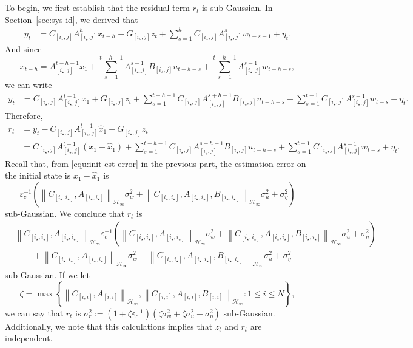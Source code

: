 \documentclass[11pt, twoside]{article}
\theoremstyle{definition}
\newcommand{\norm}[1]{\left\lVert #1 \right\rVert}
\newcommand{\hinfnorm}[1]{\norm{#1}_{\mathcal{H}_\infty}}
\begin{document}
To begin, we first establish that the residual term $r_t$ is sub-Gaussian.
In Section~\ref{sec:sys-id}, we derived that
\begin{align*}
    y_t
    &= C_{[i_\star, j]} A_{[i_\star, j]}^{h} x_{t-h} +  G_{[i_\star, j]} z_t +  \sum_{s=1}^h C_{[i_\star, j]} A_{[i_\star, j]}^{s} w_{t-s-1} +  \eta_t.
\end{align*}
And since
\[x_{t-h} = A_{[i_\star, j]}^{t-h-1} x_{1} + \sum_{s=1}^{t-h-1} A_{[i_\star, j]}^{s-1} B_{[i_\star, j]} u_{t-h-s} + \sum_{s=1}^{t-h-1} A_{[i_\star, j]}^{s-1} w_{t-h-s},\]
we can write
\begin{align*}
    y_t
    &= C_{[i_\star, j]} A_{[i_\star, j]}^{t-1} x_{1} + G_{[i_\star, j]} z_t + \sum_{s=1}^{t-h-1} C_{[i_\star, j]} A_{[i_\star, j]}^{s+h-1} B_{[i_\star, j]} u_{t-h-s} + \sum_{s=1}^{t-1} C_{[i_\star, j]} A_{[i_\star, j]}^{s-1} w_{t-s} + \eta_t.
\end{align*}
Therefore, 
\begin{align*}
    r_t 
    &= y_t - C_{[i_\star,j]}A_{[i_\star,j]}^{t-1} \hat{x}_1 - G_{[i_\star,j]} z_t \\
    &= C_{[i_\star, j]} A_{[i_\star, j]}^{t-1} (x_{1} - \hat{x}_1) + \sum_{s=1}^{t-h-1} C_{[i_\star, j]} A_{[i_\star, j]}^{s+h-1} B_{[i_\star, j]} u_{t-h-s} + \sum_{s=1}^{t-1} C_{[i_\star, j]} A_{[i_\star, j]}^{s-1} w_{t-s} + \eta_t.
\end{align*}
Recall that, from \eqref{equ:init-est-error} in the previous part, the estimation error on the initial state is $x_1 - \hat{x}_1$ is 
\[ \varepsilon_c^{-1}(\hinfnorm{C_{[i_\star, i_\star]}, A_{[i_\star, i_\star]}}\sigma_w^2 + \hinfnorm{C_{[i_\star, i_\star]}, A_{[i_\star, i_\star]}, B_{[i_\star, i_\star]}}\sigma_u^2 + \sigma_\eta^2)\]
sub-Gaussian.
We conclude that $r_t$ is
\begin{align*}
    & \hinfnorm{C_{[i_\star, i_\star]}, A_{[i_\star, i_\star]}} \varepsilon_c^{-1}(\hinfnorm{C_{[i_\star, i_\star]}, A_{[i_\star, i_\star]}}\sigma_w^2 + \hinfnorm{C_{[i_\star, i_\star]}, A_{[i_\star, i_\star]}, B_{[i_\star, i_\star]}}\sigma_u^2 + \sigma_\eta^2) \\
    &\quad\quad+ \hinfnorm{C_{[i_\star, i_\star]}, A_{[i_\star, i_\star]}} \sigma_w^2 + \hinfnorm{C_{[i_\star, i_\star]}, A_{[i_\star, i_\star]}, B_{[i_\star, i_\star]}} \sigma_u^2 + \sigma_\eta^2
\end{align*}
sub-Gaussian.
If we let 
\[\zeta = \max \left\{\hinfnorm{C_{[i, i]}, A_{[i, i]}}, \hinfnorm{C_{[i, i]}, A_{[i, i]}, B_{[i, i]}} : 1 \le i \le N\right\},\]
we can say that $r_t$ is
$\sigma_r^2 := (1 + \zeta \varepsilon_c^{-1})(\zeta \sigma_w^2 + \zeta \sigma_u^2 + \sigma_\eta^2)$
sub-Gaussian.
Additionally, we note that this calculations implies that $z_t$ and $r_t$ are independent.
\end{document}
